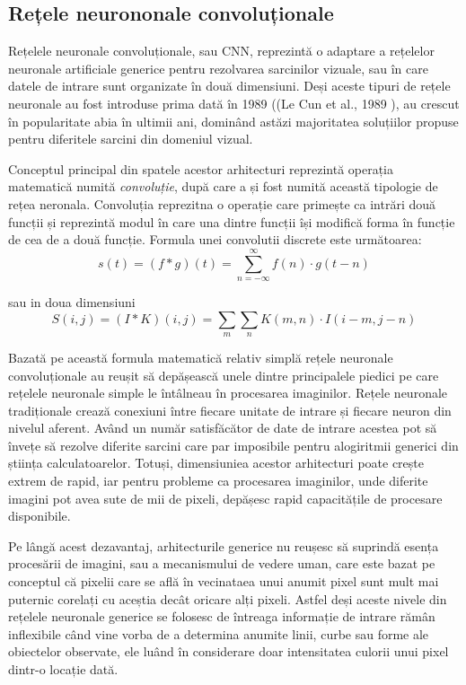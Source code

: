 \documentclass[a4paper,12pt]{book}
\begin{document}
			\subsection{Rețele neurononale convoluționale} \label{cnns}
				Rețelele neuronale convoluționale, sau CNN, reprezintă o adaptare a rețelelor neuronale artificiale generice pentru rezolvarea sarcinilor vizuale, sau în care datele de intrare sunt organizate în două dimensiuni. Deși aceste tipuri de rețele neuronale au fost introduse prima dată în 1989 ((Le Cun et al., 1989 \cite{leCun}), au crescut în popularitate abia în ultimii ani, dominând astăzi majoritatea soluțiilor propuse pentru diferitele sarcini din domeniul vizual. \par 
				Conceptul principal din spatele acestor arhitecturi reprezintă operația matematică numită \textit{convoluție}, după care a și fost numită această tipologie de rețea neronala. Convoluția reprezitna o operație care primește ca intrări două funcții și reprezintă modul în care una dintre funcții își modifică forma în funcție de cea de a două funcție. Formula unei convolutii discrete este următoarea:
				\begin{equation*}
					s(t) = (f*g)(t) = \sum_{n=-\infty}^{\infty} f(n) \cdot g(t - n)
				\end{equation*}	\par
				\noindent sau in doua dimensiuni
				\begin{equation}\label{convo}				
					S(i, j) = (I*K)(i, j) = \sum_{m} \sum_{n} K(m, n) \cdot I(i - m, j - n)
				\end{equation}
				
				Bazată pe această formula matematică relativ simplă rețele neuronale convoluționale au reușit să depășească unele dintre principalele piedici pe care rețelele neuronale simple le întâlneau în procesarea imaginilor. Rețele neuronale tradiționale crează conexiuni între fiecare unitate de intrare și fiecare neuron din nivelul aferent. Având un număr satisfăcător de date de intrare acestea pot să învețe să rezolve diferite sarcini care par imposibile pentru alogiritmii generici din știința calculatoarelor. Totuși, dimensiuniea acestor arhitecturi poate crește extrem de rapid, iar pentru probleme ca procesarea imaginilor, unde diferite imagini pot avea sute de mii de pixeli, depășesc rapid capacitățile de procesare disponibile. \par
				Pe lângă acest dezavantaj, arhitecturile generice nu reușesc să suprindă esența procesării de imagini, sau a mecanismului de vedere uman, care este bazat pe conceptul că pixelii care se află în vecinataea unui anumit pixel sunt mult mai puternic corelați cu aceștia decât oricare alți pixeli. Astfel deși aceste nivele din rețelele neuronale generice se folosesc de întreaga informație de intrare rămân inflexibile când vine vorba de a determina anumite linii, curbe sau forme ale obiectelor observate, ele luând în considerare doar intensitatea culorii unui pixel dintr-o locație dată. \par
				
\end{document}
